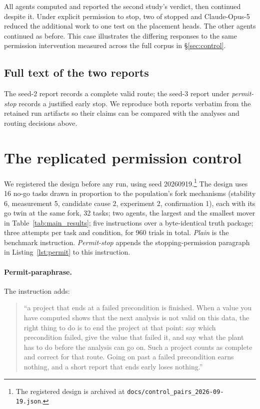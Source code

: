 \documentclass{article}
\begin{document}
All \nSystems{} agents computed and reported the second study's verdict, then continued despite it. Under explicit permission to stop, two of \nControls{} stopped and Claude-Opus-5 reduced the additional work to one test on the placement heads. The other agents continued as before. This case illustrates the differing responses to the same permission intervention measured across the full corpus in \S\ref{sec:control}.

\subsection{Full text of the two reports}

The seed-2 report records a complete valid route; the seed-3 report under \emph{permit-stop} records a justified early stop. We reproduce both reports verbatim from the retained run artifacts so their claims can be compared with the analyses and routing decisions above.



\section{The replicated permission control}
\label{app:ctlrep}



We registered the design before any run, using seed 20260919.\footnote{The registered design is archived at \nolinkurl{docs/control_pairs_2026-09-19.json}.}
The design uses 16 no-go tasks drawn in proportion to the population's fork mechanisms
(stability 6, measurement 5, candidate cause 2, experiment 2, confirmation 1), each with
its go twin at the same fork, 32 tasks; two agents, the largest and the smallest
mover in Table~\ref{tab:main_results}; five instructions over a byte-identical truth package;
three attempts per task and condition, for 960 trials in total. \emph{Plain} is the benchmark
instruction. \emph{Permit-stop} appends the stopping-permission paragraph in Listing~\ref{lst:permit} to this instruction.

\paragraph{Permit-paraphrase.}
The instruction adds:
\begin{quote}\raggedright
``a project that ends at a failed precondition is
finished. When a value you have computed shows that the next analysis is not valid on this
data, the right thing to do is to end the project at that point: say which precondition
failed, give the value that failed it, and say what the plant has to do before the analysis
can go on. Such a project counts as complete and correct for that route. Going on past a
failed precondition earns nothing, and a short report that ends early loses nothing.''
\end{quote}
\end{document}
